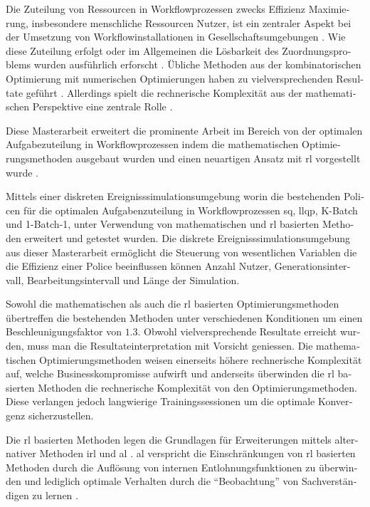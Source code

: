 \begin{otherlanguage}{ngerman}
	\begin{zusammenfassung}
	Die Zuteilung von Ressourcen in Workflowprozessen zwecks Effizienz Maximierung, insbesondere menschliche Ressourcen \dhg Nutzer, ist ein zentraler Aspekt bei der Umsetzung von Workflowinstallationen in Gesellschaftsumgebungen \citep{Mentzas2001}. Wie diese Zuteilung erfolgt oder im Allgemeinen die Lösbarkeit des Zuordnungsproblems wurden ausführlich erforscht \citep{Zeng2005}. Übliche Methoden aus der kombinatorischen Optimierung mit numerischen Optimierungen haben zu vielversprechenden Resultate geführt \citep{Zeng2005}. Allerdings spielt die rechnerische Komplexität aus der mathematischen Perspektive eine zentrale Rolle \citep{Zeng2005}.

	Diese Masterarbeit erweitert die prominente Arbeit im Bereich von der optimalen Aufgabezuteilung in Workflowprozessen indem die mathematischen Optimierungsmethoden ausgebaut wurden und einen neuartigen Ansatz mit \gls{rl} vorgestellt wurde \citep{Sutton2017}.

	Mittels einer diskreten Ereignisssimulationsumgebung worin die bestehenden Policen für die optimalen Aufgabenzuteilung in Workflowprozessen \zbg \gls{sq}, \gls{llqp}, K-Batch und 1-Batch-1, unter Verwendung von mathematischen und \gls{rl} basierten Methoden erweitert und getestet wurden. Die diskrete Ereignisssimulationsumgebung aus dieser Masterarbeit ermöglicht die Steuerung von wesentlichen Variablen die die Effizienz einer Police beeinflussen können \zbg Anzahl Nutzer, Generationsintervall, Bearbeitungsintervall und Länge der Simulation.

	Sowohl die mathematischen als auch die \gls{rl} basierten Optimierungsmethoden übertreffen die bestehenden Methoden unter verschiedenen Konditionen um einen Beschleunigungsfaktor von $1.3$. Obwohl vielversprechende Resultate erreicht wurden, muss man die Resultateinterpretation mit Vorsicht geniessen. Die mathematischen Optimierungsmethoden weisen einerseits höhere rechnerische Komplexität auf, welche Businesskompromisse aufwirft und anderseits überwinden die \gls{rl} basierten Methoden die rechnerische Komplexität von den Optimierungsmethoden. Diese verlangen jedoch langwierige Trainingssessionen um die optimale Konvergenz sicherzustellen.

	Die \gls{rl} basierten Methoden legen die Grundlagen für Erweiterungen mittels alternativer Methoden \zbg \gls{irl} \citep{Ng2000} und \gls{al} \citep{Abbeel2004}. \gls{al} verspricht die Einschränkungen von \gls{rl} basierten Methoden durch die Auflösung von internen Entlohnungsfunktionen zu überwinden und lediglich optimale Verhalten durch die ``Beobachtung'' von Sachverständigen zu lernen \citep{Abbeel2004}.
	\end{zusammenfassung}
\end{otherlanguage}